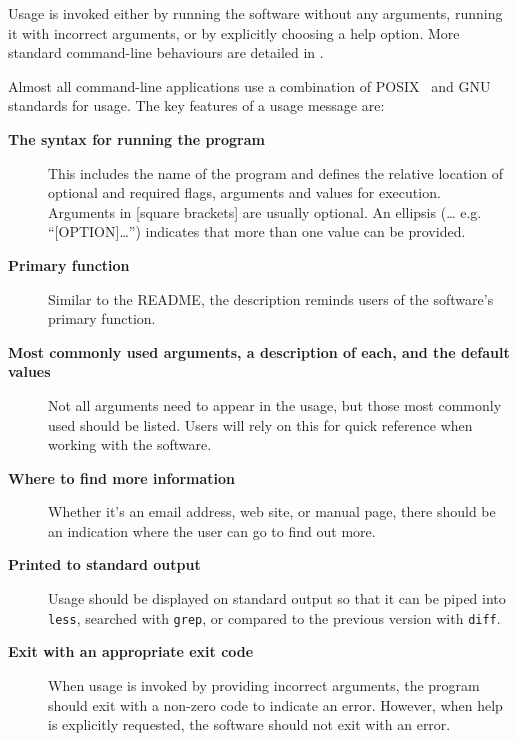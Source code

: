 \documentclass[10pt,letterpaper]{article}
\newcommand{\ruleminor}[1]{\textbf{#1}}
\begin{document}
Usage is invoked either by running the software without
any arguments, running it with incorrect arguments, or by
explicitly choosing a help option.
More standard command-line behaviours are detailed in \cite{Seemann2013}.

Almost all command-line applications use a combination of
POSIX~\cite{posix2016} and GNU~\cite{gnustandards} standards for usage. 
The key features of a usage message are:

\begin{description}

\item[\ruleminor{The syntax for running the program}] This includes the
  name of the program and defines the relative location of optional
  and required flags, arguments and values for execution.  Arguments
  in {[}square brackets{]} are usually optional. An ellipsis (\ldots
  e.g. ``{[}OPTION{]}\ldots{}'') indicates that more than one value
  can be provided.

\item[\ruleminor{Primary function}] Similar to the README, the description
  reminds users of the software's primary function.

\item[\ruleminor{Most commonly used arguments, a description of each, and
    the default values}] Not all arguments need to appear in the
  usage, but those most commonly used should be listed. Users will
  rely on this for quick reference when working with the software.

\item[\ruleminor{Where to find more information}] Whether it's an email
  address, web site, or manual page, there should be an indication
  where the user can go to find out more.

\item[\ruleminor{Printed to standard output}] Usage should be displayed
  on standard output so that it can be piped into \texttt{less},
  searched with \texttt{grep}, or compared to the previous version
  with \texttt{diff}.

\item[\ruleminor{Exit with an appropriate exit code}] When usage is
  invoked by providing incorrect arguments, the program should exit
  with a non-zero code to indicate an error. However, when help is
  explicitly requested, the software should not exit with an error.

\end{description}
\end{document}
